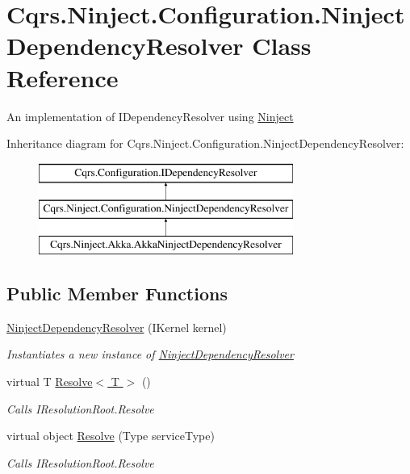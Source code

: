 \hypertarget{classCqrs_1_1Ninject_1_1Configuration_1_1NinjectDependencyResolver}{}\section{Cqrs.\+Ninject.\+Configuration.\+Ninject\+Dependency\+Resolver Class Reference}
\label{classCqrs_1_1Ninject_1_1Configuration_1_1NinjectDependencyResolver}


An implementation of I\+Dependency\+Resolver using \hyperlink{namespaceCqrs_1_1Ninject}{Ninject}  


Inheritance diagram for Cqrs.\+Ninject.\+Configuration.\+Ninject\+Dependency\+Resolver\+:\begin{figure}[H]
\begin{center}
\leavevmode
\includegraphics[height=3.000000cm]{classCqrs_1_1Ninject_1_1Configuration_1_1NinjectDependencyResolver}
\end{center}
\end{figure}
\subsection*{Public Member Functions}
\begin{DoxyCompactItemize}
\item 
\hyperlink{classCqrs_1_1Ninject_1_1Configuration_1_1NinjectDependencyResolver_a4fcafd900ce217f2da9c703a0c2413f8}{Ninject\+Dependency\+Resolver} (I\+Kernel kernel)
\begin{DoxyCompactList}\small\item\em Instantiates a new instance of \hyperlink{classCqrs_1_1Ninject_1_1Configuration_1_1NinjectDependencyResolver}{Ninject\+Dependency\+Resolver} \end{DoxyCompactList}\item 
virtual T \hyperlink{classCqrs_1_1Ninject_1_1Configuration_1_1NinjectDependencyResolver_a35cbb03e98326a3d10ba86c427148b3c}{Resolve$<$ T $>$} ()
\begin{DoxyCompactList}\small\item\em Calls I\+Resolution\+Root.\+Resolve \end{DoxyCompactList}\item 
virtual object \hyperlink{classCqrs_1_1Ninject_1_1Configuration_1_1NinjectDependencyResolver_aef2a2be58a2562a349572e9946cd2930}{Resolve} (Type service\+Type)
\begin{DoxyCompactList}\small\item\em Calls I\+Resolution\+Root.\+Resolve \end{DoxyCompactList}\end{DoxyCompactItemize}

